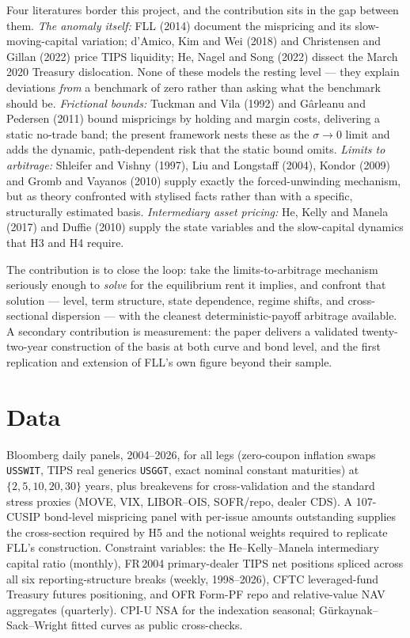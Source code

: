 \documentclass[11pt]{article}
\begin{document}
Four literatures border this project, and the contribution sits in the gap between them. \emph{The anomaly itself:} FLL (2014) document the mispricing and its slow-moving-capital variation; d'Amico, Kim and Wei (2018) and Christensen and Gillan (2022) price TIPS liquidity; He, Nagel and Song (2022) dissect the March 2020 Treasury dislocation. None of these models the resting level --- they explain deviations \emph{from} a benchmark of zero rather than asking what the benchmark should be. \emph{Frictional bounds:} Tuckman and Vila (1992) and Gârleanu and Pedersen (2011) bound mispricings by holding and margin costs, delivering a static no-trade band; the present framework nests these as the $\sigma\to0$ limit and adds the dynamic, path-dependent risk that the static bound omits. \emph{Limits to arbitrage:} Shleifer and Vishny (1997), Liu and Longstaff (2004), Kondor (2009) and Gromb and Vayanos (2010) supply exactly the forced-unwinding mechanism, but as theory confronted with stylised facts rather than with a specific, structurally estimated basis. \emph{Intermediary asset pricing:} He, Kelly and Manela (2017) and Duffie (2010) supply the state variables and the slow-capital dynamics that H3 and H4 require.

The contribution is to close the loop: take the limits-to-arbitrage mechanism seriously enough to \emph{solve} for the equilibrium rent it implies, and confront that solution --- level, term structure, state dependence, regime shifts, and cross-sectional dispersion --- with the cleanest deterministic-payoff arbitrage available. A secondary contribution is measurement: the paper delivers a validated twenty-two-year construction of the basis at both curve and bond level, and the first replication and extension of FLL's own figure beyond their sample.

\section{Data}

Bloomberg daily panels, 2004--2026, for all legs (zero-coupon inflation swaps \texttt{USSWIT}, TIPS real generics \texttt{USGGT}, exact nominal constant maturities) at $\{2,5,10,20,30\}$ years, plus breakevens for cross-validation and the standard stress proxies (MOVE, VIX, LIBOR--OIS, SOFR/repo, dealer CDS). A 107-CUSIP bond-level mispricing panel with per-issue amounts outstanding supplies the cross-section required by H5 and the notional weights required to replicate FLL's construction. Constraint variables: the He--Kelly--Manela intermediary capital ratio (monthly), FR\,2004 primary-dealer TIPS net positions spliced across all six reporting-structure breaks (weekly, 1998--2026), CFTC leveraged-fund Treasury futures positioning, and OFR Form-PF repo and relative-value NAV aggregates (quarterly). CPI-U NSA for the indexation seasonal; Gürkaynak--Sack--Wright fitted curves as public cross-checks.
\end{document}
